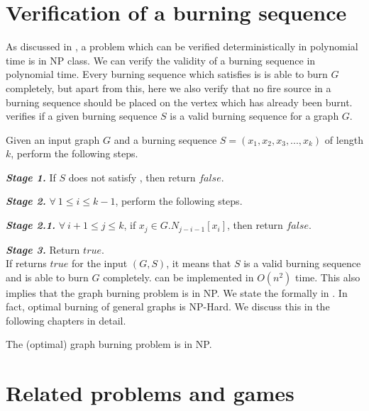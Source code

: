 \section{Verification of a burning sequence}\label{section:burning-verify}

As discussed in , a problem which can be verified deterministically in polynomial time is in NP class. We can verify the validity of a burning sequence in polynomial time. Every burning sequence which satisfies  is is able to burn $G$ completely, but apart from this, here we also verify that no fire source in a burning sequence should be placed on the vertex which has already been burnt.  verifies if a given burning sequence $S$ is a valid burning sequence for a graph $G$.

\begin{algorithm}\label{algorithm:burn-verify}
Given an input graph $G$ and a burning sequence $S = (x_1, x_2, x_3, . . ., x_k)$ of length $k$, perform the following steps.
\end{algorithm}

\textbf{\textit{Stage 1.}} If $S$ does not satisfy , then return $false$.

\textbf{\textit{Stage 2.}} $\forall\ 1\leq i\leq k-1$, perform the following steps.

\textbf{\textit{Stage 2.1.}} $\forall\ i+1\leq j\leq k$, if $x_j \in G.N_{j-i-1}[x_i]$, then return $false$.

\textbf{\textit{Stage 3.}} Return $true$.\\

If  returns $true$ for the input $(G,S)$, it means that $S$ is a valid burning sequence and is able to burn $G$ completely.  can be implemented in $O(n^2)$ time. This also implies that the graph burning problem is in NP. We state the formally in . In fact, optimal burning of general graphs is NP-Hard. We discuss this in the following chapters in detail.

\begin{lemma}\label{lemma:burning-in-NP}
    The (optimal) graph burning problem is in NP.
\end{lemma}

\section{Related problems and games}\label{section:related-games}

